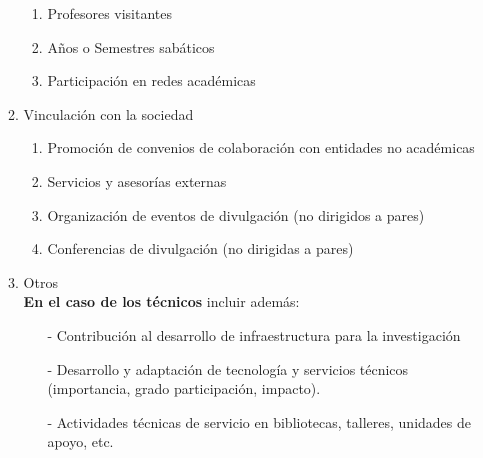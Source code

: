 \documentclass[12pt]{report}
\begin{document}
\begin{enumerate}
\begin{enumerate}
\begin{enumerate}
                        \item Profesores visitantes
                        \item Años o Semestres sabáticos
                        \item Participación en redes académicas \\
                        \end{enumerate}
                \item Vinculación con la sociedad
                        \begin{enumerate}
                        \item Promoción de convenios de colaboración con entidades no académicas
                        \item Servicios y asesorías externas
                        \item Organización de eventos de divulgación (no dirigidos a pares)
                        \item Conferencias de divulgación (no dirigidas a pares) \\
                        \end{enumerate}
             \item Otros \\
                \textbf{En el caso de los técnicos} incluir además:
                \begin{small}
                 \begin{itemize}
                \item[-] Contribución al desarrollo de infraestructura para la investigación
                \item[-] Desarrollo y adaptación de tecnología y servicios técnicos (importancia, grado participación, impacto).
                \item[-] Actividades técnicas de servicio en bibliotecas, talleres, unidades de apoyo, etc.
                \end{itemize}
                 \end{small}
                \end{enumerate}


\end{enumerate}
\end{document}
